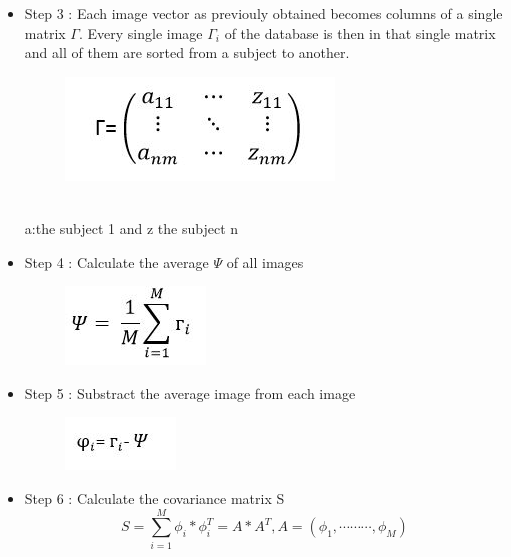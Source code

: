 \begin{itemize}
\item Step 3 : Each image vector as previouly obtained becomes columns of a single matrix $\Gamma$. Every single image $\Gamma_{i}$ of the database is then in that single matrix and all of them are sorted from a subject to another. 
\begin{figure}[bth]%
\begin{center}
\includegraphics[scale=0.75]{grandematrice}%
\label{grandematrice}%
\end {center}
\end{figure} 
\\a:the subject 1 and z the subject n
\newpage
\item Step 4 : Calculate the average $\Psi$ of all images
\begin{figure}[bth]%
\begin{center}
\includegraphics[scale=0.75]{moyenne}%
\label{moyenne}%
\end {center}
\end{figure} 
\item Step 5 : Substract the average image  from each image
\begin{figure}[bth]%
\begin{center}
\includegraphics[scale=0.75]{centrage}%
\label{centrage}%
\end {center}
\end{figure}
\item Step 6 : Calculate the covariance matrix S
\begin{displaymath}
S= \sum_{i=1}^{M} \phi_{i} * \phi_{i} ^{T}= A * A ^{T} , A = (\phi_{1},\cdots \cdots  \cdots, \phi_{M})%
\end{displaymath}


\end{itemize}
